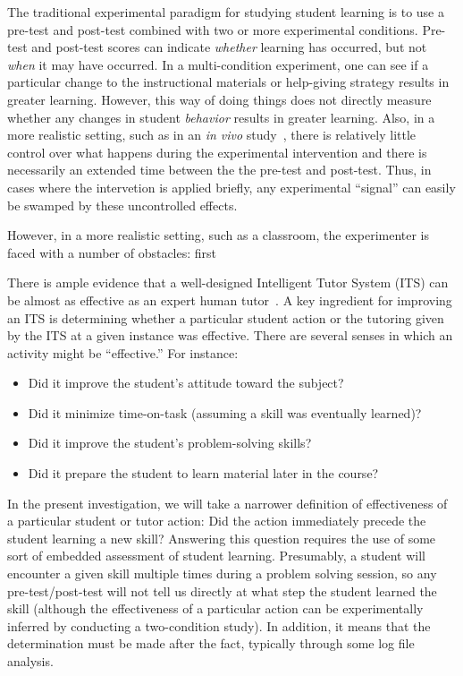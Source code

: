 \documentclass{acmlarge-edm}
\begin{document}
The traditional experimental paradigm for studying student learning
is to use a pre-test and post-test combined with two or more experimental
conditions.  Pre-test and post-test scores can indicate {\em whether}
learning has occurred, but not {\em when} it may have occurred.  In a
multi-condition experiment, one can see if a particular change
to the instructional materials or help-giving strategy results in 
greater learning.  However, this way of doing things does not directly measure whether
any changes in student {\em behavior} results in greater learning.
Also, in a more realistic setting, such as in an {\em in vivo}
study~\cite{in-vivo}, there is relatively little control over what
happens during the experimental intervention and there is necessarily
an extended time between the the pre-test and post-test.  Thus, in
cases where the intervetion is applied briefly, any
experimental ``signal'' can easily be swamped by these uncontrolled effects.


However, in a more realistic setting, such as a
classroom, the experimenter is faced with a number of obstacles:
first

There is ample evidence that a well-designed Intelligent Tutor System
(ITS) can be almost as effective as an expert human
tutor~\cite{vanlehn_relative_2011}.  A key ingredient for improving an
ITS is determining whether a particular student action or the tutoring
given by the ITS at a given instance was effective.  There are several
senses in which an activity might be ``effective.''  For instance:
%
\begin{itemize}
\item Did it improve the student's attitude toward
the subject?  
\item Did it minimize time-on-task (assuming 
a skill was eventually learned)?  
\item Did it improve the student's 
problem-solving skills?  
\item Did it prepare the student to learn
material later in the course?
\end{itemize}

In the present investigation, we will take a narrower definition
of effectiveness of a particular student or tutor action:  
Did the action immediately precede the
student learning a new skill?  Answering this question requires
the use of some sort of embedded assessment of student learning.
Presumably, a student will encounter a given skill multiple times
during a problem solving session, so any pre-test/post-test will
not tell us directly at what step the student learned the skill
(although the effectiveness of a particular action can
be experimentally inferred by conducting a two-condition study).
In addition, it means that the determination must be made
after the fact, typically through some log file analysis. 
\end{document}
